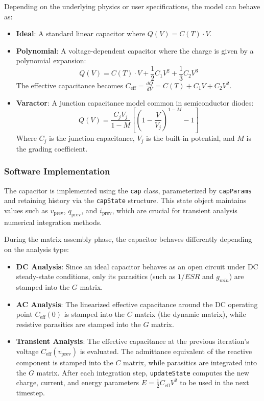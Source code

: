 Depending on the underlying physics or user specifications, the model can behave as:
\begin{itemize}
    \item \textbf{Ideal}: A standard linear capacitor where $Q(V) = C(T) \cdot V$.
    \item \textbf{Polynomial}: A voltage-dependent capacitor where the charge is given by a polynomial expansion:
    \begin{equation}
        Q(V) = C(T) \cdot V + \frac{1}{2} C_1 V^2 + \frac{1}{3} C_2 V^3
    \end{equation}
    The effective capacitance becomes $C_{\text{eff}} = \frac{dQ}{dV} = C(T) + C_1 V + C_2 V^2$.
    \item \textbf{Varactor}: A junction capacitance model common in semiconductor diodes:
    \begin{equation}
        Q(V) = \frac{C_j V_j}{1 - M} \left[ \left(1 - \frac{V}{V_j}\right)^{1 - M} - 1 \right]
    \end{equation}
    Where $C_j$ is the junction capacitance, $V_j$ is the built-in potential, and $M$ is the grading coefficient.
\end{itemize}

\subsubsection{Software Implementation}
The capacitor is implemented using the \texttt{cap} class, parameterized by \texttt{capParams} and retaining history via the \texttt{capState} structure. This state object maintains values such as $v_{\text{prev}}$, $q_{\text{prev}}$, and $i_{\text{prev}}$, which are crucial for transient analysis numerical integration methods.

During the matrix assembly phase, the capacitor behaves differently depending on the analysis type:
\begin{itemize}
    \item \textbf{DC Analysis}: Since an ideal capacitor behaves as an open circuit under DC steady-state conditions, only its parasitics (such as $1/ESR$ and $g_{min}$) are stamped into the $G$ matrix.
    \item \textbf{AC Analysis}: The linearized effective capacitance around the DC operating point $C_{\text{eff}}(0)$ is stamped into the $C$ matrix (the dynamic matrix), while resistive parasitics are stamped into the $G$ matrix.
    \item \textbf{Transient Analysis}: The effective capacitance at the previous iteration's voltage $C_{\text{eff}}(v_{\text{prev}})$ is evaluated. The admittance equivalent of the reactive component is stamped into the $C$ matrix, while parasitics are integrated into the $G$ matrix. After each integration step, \texttt{updateState} computes the new charge, current, and energy parameters $E = \frac{1}{2} C_{\text{eff}} V^2$ to be used in the next timestep.
\end{itemize}

